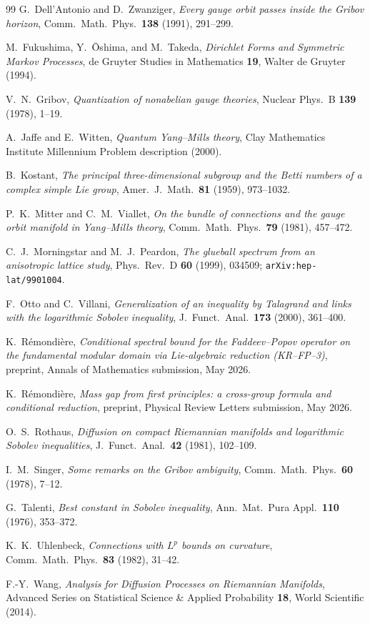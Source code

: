 \documentclass[11pt,a4paper]{amsart}
\theoremstyle{definition}
\begin{document}
\begin{thebibliography}{99}
G.~Dell'Antonio and D.~Zwanziger,
\emph{Every gauge orbit passes inside the Gribov horizon},
Comm.~Math.~Phys.~\textbf{138} (1991), 291--299.

M.~Fukushima, Y.~\=Oshima, and M.~Takeda,
\emph{Dirichlet Forms and Symmetric Markov Processes},
de Gruyter Studies in Mathematics \textbf{19}, Walter de Gruyter (1994).

V.~N.~Gribov,
\emph{Quantization of nonabelian gauge theories},
Nuclear Phys.~B \textbf{139} (1978), 1--19.

A.~Jaffe and E.~Witten,
\emph{Quantum Yang--Mills theory}, Clay Mathematics Institute Millennium
Problem description (2000).

B.~Kostant,
\emph{The principal three-dimensional subgroup and the Betti numbers of a
complex simple Lie group},
Amer.~J.~Math.~\textbf{81} (1959), 973--1032.

P.~K.~Mitter and C.~M.~Viallet,
\emph{On the bundle of connections and the gauge orbit manifold in
Yang--Mills theory},
Comm.~Math.~Phys.~\textbf{79} (1981), 457--472.

C.~J.~Morningstar and M.~J.~Peardon,
\emph{The glueball spectrum from an anisotropic lattice study},
Phys.~Rev.~D \textbf{60} (1999), 034509;
\texttt{arXiv:hep-lat/9901004}.

F.~Otto and C.~Villani,
\emph{Generalization of an inequality by Talagrand and links with the
logarithmic Sobolev inequality},
J.~Funct.~Anal.~\textbf{173} (2000), 361--400.

K.~R\'emondi\`ere,
\emph{Conditional spectral bound for the Faddeev--Popov operator on the
fundamental modular domain via Lie-algebraic reduction (KR--FP--3)},
preprint, Annals of Mathematics submission, May 2026.

K.~R\'emondi\`ere,
\emph{Mass gap from first principles: a cross-group formula and conditional
reduction},
preprint, Physical Review Letters submission, May 2026.

O.~S.~Rothaus,
\emph{Diffusion on compact Riemannian manifolds and logarithmic Sobolev
inequalities},
J.~Funct.~Anal.~\textbf{42} (1981), 102--109.

I.~M.~Singer,
\emph{Some remarks on the {Gribov} ambiguity},
Comm.~Math.~Phys.~\textbf{60} (1978), 7--12.

G.~Talenti,
\emph{Best constant in {Sobolev} inequality},
Ann.~Mat.~Pura Appl.~\textbf{110} (1976), 353--372.

K.~K.~Uhlenbeck,
\emph{Connections with $L^p$ bounds on curvature},
Comm.~Math.~Phys.~\textbf{83} (1982), 31--42.

F.-Y.~Wang,
\emph{Analysis for Diffusion Processes on Riemannian Manifolds},
Advanced Series on Statistical Science \& Applied Probability \textbf{18},
World Scientific (2014).

\end{thebibliography}
\end{document}
